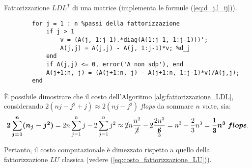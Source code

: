 \begin{algorithm}
\caption{Fattorizzazione $LDL^T$ di una matrice (implementa le formule (\ref{eq:d_j,l_ij})).}
\label{alg:fattorizzazione_LDL}
    \begin{lstlisting}[style=Matlab-editor]
        %A e' la matrice n*n in ingresso. La parte triangolare inferiore di questa contiene l'informazione dei fattori L e D
        for j = 1 : n %passi della fattorizzazione
            if j > 1
                v = (A(j, 1:j-1).*diag(A(1:j-1, 1:j-1)))';
                A(j,j) = A(j,j) - A(j, 1:j-1)*v; %d_j
            end
            if A(j,j) <= 0, error('A non sdp'), end
            A(j+1:n, j) = (A(j+1:n, j) - A(j+1:n, 1:j-1)*v)/A(j,j);
        end
    \end{lstlisting}
\end{algorithm}

È possibile dimostrare che il costo dell'Algoritmo \ref{alg:fattorizzazione_LDL}, considerando $2(nj-j^2+j)\approx 2(nj-j^2)$ \textit{flops} da sommare $n$ volte, sia:
\begin{equation}
   \boldsymbol{2\sum_{j=1}^n(n_j-j^2)}=2n\sum_{j=1}^n j - 2\sum_{j=1}^n j^2\approx \cancel{2}n \frac{n^2}{\cancel{2}} - \cancel{2}\frac{2n^3}{\underset{3}{\cancel{6}}}=n^3-\frac{2}{3}n^3=\boldsymbol{\frac{1}{3}n^3\; flops}.
\end{equation}

Pertanto, il costo computazionale è dimezzato rispetto a quello della fattorizzazione $LU$ classica (vedere (\ref{eq:costo_fattorizzazione_LU})).

